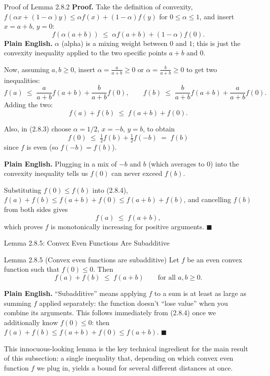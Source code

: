 \documentclass[aspectratio=169,10pt]{beamer}
\begin{document}
\begin{frame}[allowframebreaks]{Proof of Lemma 2.8.2}
  \textbf{Proof.} Take the definition of convexity,
  $f(\alpha x + (1-\alpha)y) \le \alpha f(x) + (1-\alpha)f(y)$ for
  $0\le\alpha\le 1$, and insert $x = a+b$, $y=0$:
  \begin{equation}
    f(\alpha(a+b)) \;\le\; \alpha f(a+b) + (1-\alpha) f(0). \tag{2.8.3}
  \end{equation}
  \textbf{Plain English.} $\alpha$ (alpha) is a mixing weight between $0$
  and $1$; this is just the convexity inequality applied to the two specific
  points $a+b$ and $0$.

  Now, assuming $a,b\ge 0$, insert $\alpha = \frac{a}{a+b} \ge 0$ or
  $\alpha = \frac{b}{a+b} \ge 0$ to get two inequalities:
  \[
    f(a) \;\le\; \frac{a}{a+b}f(a+b) + \frac{b}{a+b}f(0), \qquad
    f(b) \;\le\; \frac{b}{a+b}f(a+b) + \frac{a}{a+b}f(0).
  \]
  Adding the two:
  \begin{equation}
    f(a) + f(b) \;\le\; f(a+b) + f(0). \tag{2.8.4}
  \end{equation}

  \framebreak

  Also, in (2.8.3) choose $\alpha = 1/2$, $x=-b$, $y=b$, to obtain
  \[
    f(0) \;\le\; \tfrac12 f(b) + \tfrac12 f(-b) \;=\; f(b)
  \]
  since $f$ is even (so $f(-b)=f(b)$).

  \textbf{Plain English.} Plugging in a mix of $-b$ and $b$ (which averages
  to $0$) into the convexity inequality tells us $f(0)$ can never exceed
  $f(b)$.

  Substituting $f(0)\le f(b)$ into (2.8.4), $f(a)+f(b) \le f(a+b)+f(0) \le
  f(a+b)+f(b)$, and cancelling $f(b)$ from both sides gives
  \[
    f(a) \;\le\; f(a+b),
  \]
  which proves $f$ is monotonically increasing for positive arguments.
  $\blacksquare$
\end{frame}

\begin{frame}{Lemma 2.8.5: Convex Even Functions Are Subadditive}
  \begin{block}{Lemma 2.8.5 (Convex even functions are subadditive)}
    Let $f$ be an even convex function such that $f(0)\le 0$. Then
    \[
      f(a) + f(b) \;\le\; f(a+b) \qquad \text{for all } a,b \ge 0.
    \]
  \end{block}

  \textbf{Plain English.} ``Subadditive'' means applying $f$ to a sum is at
  least as large as summing $f$ applied separately: the function doesn't
  ``lose value'' when you combine its arguments. This follows immediately
  from (2.8.4) once we additionally know $f(0)\le 0$: then
  $f(a)+f(b) \le f(a+b)+f(0) \le f(a+b)$.
  $\blacksquare$

  \vspace{3mm}
  This innocuous-looking lemma is the key technical ingredient for the main
  result of this subsection: a single inequality that, depending on which
  convex even function $f$ we plug in, yields a bound for several different
  distances at once.
\end{frame}
\end{document}
